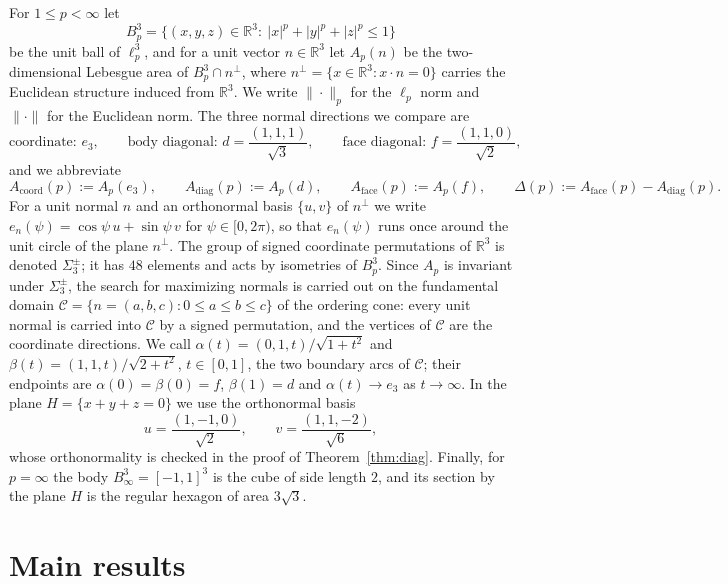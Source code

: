 \documentclass[11pt]{article}
\theoremstyle{plain}
\numberwithin{theorem}{section}
\begin{document}
For $1\le p<\infty$ let
\[
B_p^3=\{(x,y,z)\in\mathbb{R}^3:\ |x|^p+|y|^p+|z|^p\le 1\}
\]
be the unit ball of $\ell_p^3$, and for a unit vector $n\in\mathbb{R}^3$ let $A_p(n)$ be the two-dimensional Lebesgue area of $B_p^3\cap n^{\perp}$, where $n^{\perp}=\{x\in\mathbb{R}^3: x\cdot n=0\}$ carries the Euclidean structure induced from $\mathbb{R}^3$. We write $\|\cdot\|_p$ for the $\ell_p$ norm and $\|\cdot\|$ for the Euclidean norm. The three normal directions we compare are
\[
\text{coordinate: } e_3,\qquad \text{body diagonal: } d=\frac{(1,1,1)}{\sqrt3},\qquad \text{face diagonal: } f=\frac{(1,1,0)}{\sqrt2},
\]
and we abbreviate
\[
A_{\mathrm{coord}}(p):=A_p(e_3),\qquad A_{\mathrm{diag}}(p):=A_p(d),\qquad A_{\mathrm{face}}(p):=A_p(f),\qquad \Delta(p):=A_{\mathrm{face}}(p)-A_{\mathrm{diag}}(p).
\]
For a unit normal $n$ and an orthonormal basis $\{u,v\}$ of $n^{\perp}$ we write $e_n(\psi)=\cos\psi\,u+\sin\psi\,v$ for $\psi\in[0,2\pi)$, so that $e_n(\psi)$ runs once around the unit circle of the plane $n^{\perp}$. The group of signed coordinate permutations of $\mathbb{R}^3$ is denoted $\Sigma_3^{\pm}$; it has $48$ elements and acts by isometries of $B_p^3$. Since $A_p$ is invariant under $\Sigma_3^{\pm}$, the search for maximizing normals is carried out on the fundamental domain $\mathcal{C}=\{n=(a,b,c):0\le a\le b\le c\}$ of the ordering cone: every unit normal is carried into $\mathcal{C}$ by a signed permutation, and the vertices of $\mathcal{C}$ are the coordinate directions. We call $\alpha(t)=(0,1,t)/\sqrt{1+t^2}$ and $\beta(t)=(1,1,t)/\sqrt{2+t^2}$, $t\in[0,1]$, the two boundary arcs of $\mathcal{C}$; their endpoints are $\alpha(0)=\beta(0)=f$, $\beta(1)=d$ and $\alpha(t)\to e_3$ as $t\to\infty$. In the plane $H=\{x+y+z=0\}$ we use the orthonormal basis
\[
u=\frac{(1,-1,0)}{\sqrt2},\qquad v=\frac{(1,1,-2)}{\sqrt6},
\]
whose orthonormality is checked in the proof of Theorem~\ref{thm:diag}. Finally, for $p=\infty$ the body $B_\infty^3=[-1,1]^3$ is the cube of side length $2$, and its section by the plane $H$ is the regular hexagon of area $3\sqrt3$.

\section{Main results}
\end{document}
